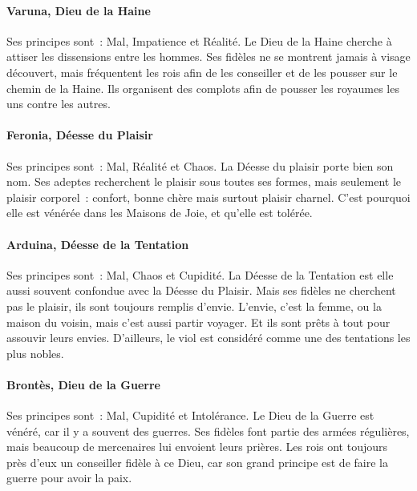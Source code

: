 \documentclass[a4paper,10pt,openany]{book}
\begin{document}
\begin{multicols}{2}
\paragraph{Varuna, Dieu de la Haine}
Ses principes sont : Mal, Impatience et Réalité. Le Dieu de la Haine cherche à attiser les dissensions entre les hommes. Ses fidèles ne se montrent
jamais à visage découvert, mais fréquentent les rois afin de les conseiller et de les pousser sur le chemin de la Haine. Ils organisent des complots
afin de pousser les royaumes les uns contre les autres.
\paragraph{Feronia, Déesse du Plaisir}
Ses principes sont : Mal, Réalité et Chaos. La Déesse du plaisir porte bien son nom. Ses adeptes recherchent le plaisir sous toutes ses formes, mais
seulement le plaisir corporel : confort, bonne chère mais surtout plaisir charnel. C’est pourquoi elle est vénérée dans les Maisons de Joie, et
qu’elle est tolérée.
\paragraph{Arduina, Déesse de la Tentation}
Ses principes sont : Mal, Chaos et Cupidité. La Déesse de la Tentation est elle aussi souvent confondue avec la Déesse du Plaisir. Mais ses fidèles ne
cherchent pas le plaisir, ils sont toujours remplis d’envie. L’envie, c’est la femme, ou la maison du voisin, mais c’est aussi partir voyager. Et ils
sont prêts à tout pour assouvir leurs envies. D’ailleurs, le viol est considéré comme une des tentations les plus nobles.
\paragraph{Brontès, Dieu de la Guerre}
Ses principes sont : Mal, Cupidité et Intolérance. Le Dieu de la Guerre est vénéré, car il y a souvent des guerres. Ses fidèles font partie des armées
régulières, mais beaucoup de mercenaires lui envoient leurs prières. Les rois ont toujours près d’eux un conseiller fidèle à ce Dieu, car son grand
principe est de faire la guerre pour avoir la paix.


\end{multicols}
\end{document}
